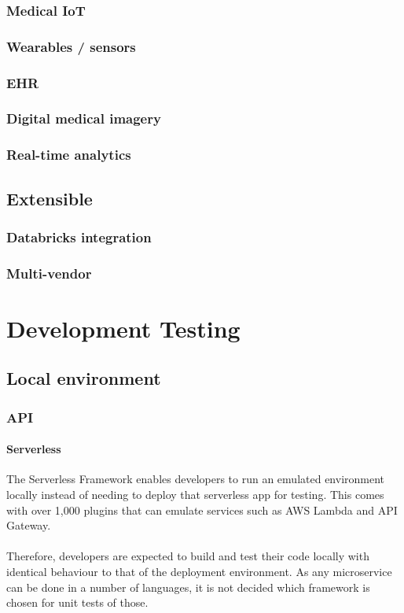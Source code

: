 \documentclass[10pt]{article}
\begin{document}
\subsubsection{Medical IoT}
\subsubsection{Wearables / sensors}
\subsubsection{EHR}
\subsubsection{Digital medical imagery}
\subsubsection{Real-time analytics}

\subsection{Extensible}
\subsubsection{Databricks integration}
\subsubsection{Multi-vendor}

\section{Development Testing}
\subsection{Local environment}

\subsubsection{API}
\paragraph{Serverless}
The Serverless Framework enables developers to run an emulated environment locally instead of needing to deploy that serverless app for testing. This comes with over 1,000 plugins that can emulate services such as AWS Lambda and API Gateway. 
\\ \\
Therefore, developers are expected to build and test their code locally with identical behaviour to that of the deployment environment. As any microservice can be done in a number of languages, it is not decided which framework is chosen for unit tests of those.
\end{document}
